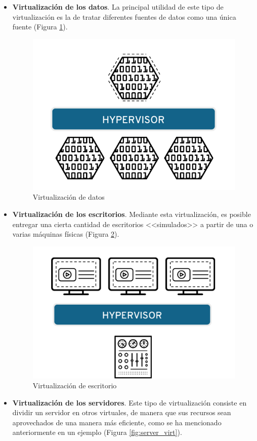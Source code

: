 \begin{itemize}
    \item \textbf{Virtualización de los datos}. La principal utilidad de este tipo de virtualización es la de tratar diferentes fuentes de datos como una única fuente (Figura \ref{fig:data_virt}).
    
        \begin{figure}[h]
          \centering
          \includegraphics[width=0.3\linewidth]{figures/images/data_virtualization.png}
          \caption{Virtualización de datos}
          \label{fig:data_virt}
        \end{figure}
        
    \clearpage
        
    \item \textbf{Virtualización de los escritorios}. Mediante esta virtualización, es posible entregar una cierta cantidad de escritorios <<simulados>> a partir de una o varias máquinas físicas (Figura \ref{fig:desktop_virt}).
    
        \begin{figure}[h]
          \centering
          \includegraphics[width=0.3\linewidth]{figures/images/desktop_virtualization.png}
          \caption{Virtualización de escritorio}
          \label{fig:desktop_virt}
        \end{figure}
        
    \item \textbf{Virtualización de los servidores}. Este tipo de virtualización consiste en dividir un servidor en otros virtuales, de manera que sus recursos sean aprovechados de una manera más eficiente, como se ha mencionado anteriormente en un ejemplo (Figura \ref{fig:server_virt}).
    

\end{itemize}
